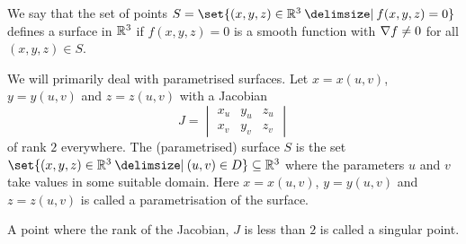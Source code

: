 \documentclass[11pt]{penrose}
\newcommand{\keyword}[1]{\textsf{#1}}
\begin{document}
We say that the set of points $S = \set{(x,y,z) \in \R^3 \st f(x,y,z) = 0}$ defines a surface in $\mathbb{R}^3$ if $f(x,y,z) = 0$ is a smooth function with $\nabla f \neq 0$ for all $(x,y,z) \in S$.

We will primarily deal with parametrised surfaces. Let $x = x(u,v)$, $y = y(u,v)$ and $z = z(u,v)$ with a \keyword{Jacobian}
\begin{equation}
    J = \begin{vmatrix} x_u & y_u & z_u\\ x_v & y_v & z_v \end{vmatrix}
\end{equation}
of rank $2$ everywhere. The (parametrised) surface $S$ is the set $\set{(x,y,z) \in \R^3 \st (u,v) \in D} \subseteq \R^3$ where the parameters $u$ and $v$ take values in some suitable domain. Here $x = x(u,v)$, $y = y(u,v)$ and $z = z(u,v)$ is called a parametrisation of the surface.

A point where the rank of the Jacobian, $J$ is less than $2$ is called a \keyword{singular point}.
\end{document}
